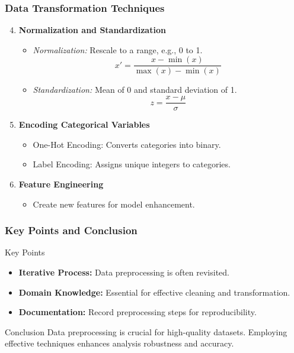 \documentclass{beamer}
\begin{document}
\begin{frame}[fragile]
    \frametitle{Data Transformation Techniques}
    \begin{enumerate}
        \setcounter{enumi}{3}
        \item \textbf{Normalization and Standardization}
            \begin{itemize}
                \item \textit{Normalization:} Rescale to a range, e.g., 0 to 1.
                \begin{equation}
                    x' = \frac{x - \min(x)}{\max(x) - \min(x)}
                \end{equation}
                \item \textit{Standardization:} Mean of 0 and standard deviation of 1.
                \begin{equation}
                    z = \frac{x - \mu}{\sigma}
                \end{equation}
            \end{itemize}
        \item \textbf{Encoding Categorical Variables}
            \begin{itemize}
                \item One-Hot Encoding: Converts categories into binary.
                \item Label Encoding: Assigns unique integers to categories.
            \end{itemize}
        \item \textbf{Feature Engineering}
            \begin{itemize}
                \item Create new features for model enhancement.
            \end{itemize}
    \end{enumerate}
\end{frame}

\begin{frame}[fragile]
    \frametitle{Key Points and Conclusion}
    \begin{block}{Key Points}
        \begin{itemize}
            \item \textbf{Iterative Process:} Data preprocessing is often revisited.
            \item \textbf{Domain Knowledge:} Essential for effective cleaning and transformation.
            \item \textbf{Documentation:} Record preprocessing steps for reproducibility.
        \end{itemize}
    \end{block}
    
    \begin{block}{Conclusion}
        Data preprocessing is crucial for high-quality datasets. Employing effective techniques enhances analysis robustness and accuracy.
    \end{block}
\end{frame}
\end{document}
